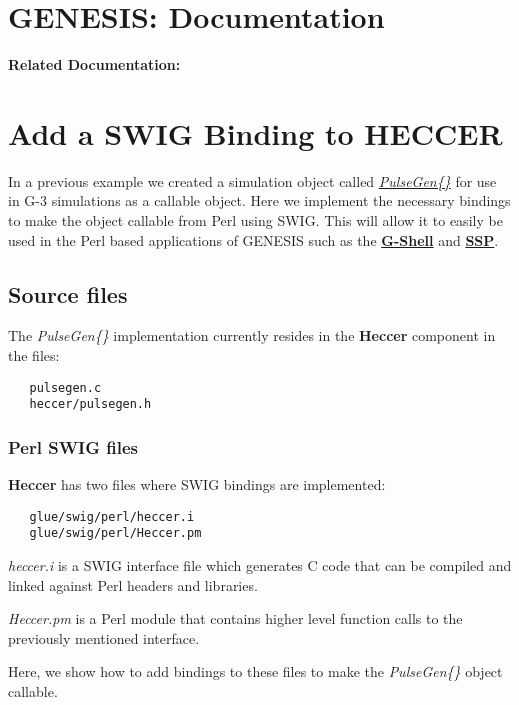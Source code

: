 \documentclass[12pt]{article}
\begin{document}
\section*{GENESIS: Documentation}

{\bf Related Documentation:}

\section*{Add a SWIG Binding to HECCER}

In a previous example we created a simulation object called \href{../genesis-add-object-solver/genesis-add-object-solver.tex}{\it PulseGen\{\}} for use in G-3 simulations as a callable object. Here we implement the necessary bindings to make the object callable from Perl using SWIG. This will allow it to easily be used in the Perl based applications of GENESIS such as the \href{../gshell/gshell.tex}{\bf G-Shell} and \href{../ssp/ssp.tex}{\bf SSP}.

\subsection*{Source files}

The {\it PulseGen\{\}} implementation currently resides in the {\bf Heccer} component in the files:
\begin{verbatim}
   pulsegen.c
   heccer/pulsegen.h
\end{verbatim}

\subsubsection*{Perl SWIG files}

{\bf Heccer} has two files where SWIG bindings are implemented:

\begin{verbatim}
   glue/swig/perl/heccer.i
   glue/swig/perl/Heccer.pm
\end{verbatim}

{\it heccer.i} is a SWIG interface file which generates C code that can be compiled and linked against Perl headers and libraries.

{\it Heccer.pm} is a Perl module that contains higher level function calls to the previously mentioned interface.

Here, we show how to add bindings to these files to make the {\it PulseGen\{\}} object callable.
\end{document}

